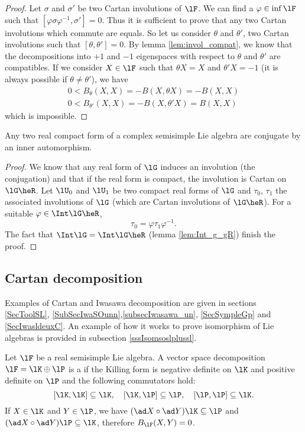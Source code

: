 \begin{proof}
Let $\sigma$ and $\sigma'$ be two Cartan involutions of $\lF$. We can find a $\varphi\in\inf\lF$ such that $[\varphi\sigma\varphi^{-1},\sigma']=0$. Thus it is sufficient to prove that any two Cartan involutions which commute are equals. So let us consider $\theta$ and $\theta'$, two Cartan involutions such that $[\theta,\theta']=0$. By lemma \ref{lem:invol_compat}, we know that the decompositions into $+1$ and $-1$  eigenspaces with respect to $\theta$ and $\theta'$ are compatibles. If we consider $X\in\lF$ such that $\theta X=X$ and $\theta' X=-1$ (it is always possible if $\theta\neq\theta'$), we have
\[
\begin{split}
  0<B_{\theta}(X,X)=-B(X,\theta X)=-B(X,X)\\
  0<B_{\theta'}(X,X)=-B(X,\theta' X)=B(X,X)
\end{split}
\]
which is impossible.
\end{proof}

\begin{corollary}
Any two real compact form of a complex semisimple Lie algebra are conjugate by an inner automorphism.
\end{corollary}

\begin{proof}
We know that any real form of $\lG$ induces an involution (the conjugation) and that if the real form is compact, the involution is Cartan on $\lG\heR$. Let $\lU_0$ and $\lU_1$ be two compact real forms of $\lG$ and $\tau_0$, $\tau_1$ the associated involutions of $\lG$ (which are Cartan involutions of $\lG\heR$). For a suitable $\varphi\in\Int\lG\heR$, 
\[
   \tau_0=\varphi\tau_1\varphi^{-1}.
\]
The fact that $\Int\lG=\Int\lG\heR$ (lemma \ref{lem:Int_g_gR}) finish the proof.

\end{proof}
\subsection{Cartan decomposition}

Examples of Cartan and Iwasawa decomposition are given in sections \ref{SecToolSL}, \ref{SubSecIwaSOunn},\ref{subsecIwasawa_un}, \ref{SecSympleGp} and \ref{SecIwasldeuxC}. An example of how it works to prove isomorphism of Lie algebras is provided in subsection \ref{sssIsomsoslplussl}.

Let $\lF$ be a real semisimple Lie algebra. A vector space decomposition $\lF=\lK\oplus\lP$ is a  if the Killing form is negative definite on $\lK$ and positive definite on $\lP$ and the following commutators hold:
\begin{equation}\label{eq:comm_Cartan}
   [\lK,\lK]\subseteq\lK,\quad[\lK,\lP]\subseteq\lP,\quad[\lP,\lP]\subseteq\lK.
\end{equation}
If $X\in\lK$ and $Y\in\lP$, we have $(\ad X\circ\ad Y)\lK\subseteq\lP$ and $(\ad X\circ\ad Y)\lP\subseteq\lK$, therefore $B_{\lF}(X,Y)=0$.

